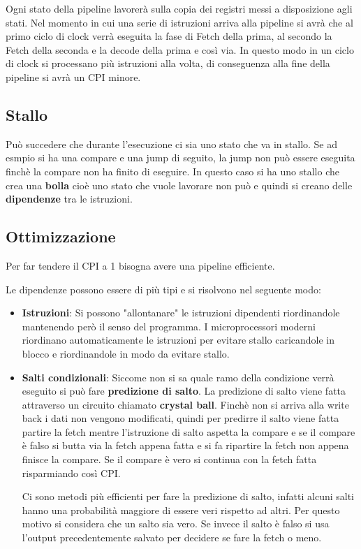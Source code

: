 \documentclass[a4paper]{article}
\theoremstyle{break}
\theoremstyle{break}
\theoremstyle{break}
\theoremstyle{break}
\begin{document}
\noindent Ogni stato della pipeline lavorerà sulla copia dei registri messi a disposizione
agli stati. Nel momento in cui una serie di istruzioni arriva alla pipeline si avrà che
al primo ciclo di clock verrà eseguita la fase di Fetch della prima, al secondo la Fetch
della seconda e la decode della prima e così via. In questo modo in un ciclo di clock
si processano più istruzioni alla volta, di conseguenza alla fine della pipeline
si avrà un CPI minore.

\subsection{Stallo}
Può succedere che durante l'esecuzione ci sia uno stato che va in stallo. Se ad esmpio
si ha una compare e una jump di seguito, la jump non può essere eseguita finchè la
compare non ha finito di eseguire. In questo caso si ha uno stallo che crea una
\textbf{bolla} cioè uno stato che vuole lavorare non può e quindi si creano delle
\textbf{dipendenze} tra le istruzioni.

\subsection{Ottimizzazione}
Per far tendere il CPI a 1 bisogna avere una pipeline efficiente.

\vspace{1em}
\noindent Le dipendenze possono essere di più tipi e si risolvono nel seguente modo:
\begin{itemize}
  \item \textbf{Istruzioni}:
    Si possono "allontanare" le istruzioni dipendenti riordinandole
    mantenendo però il senso del programma. I microprocessori moderni riordinano
    automaticamente le istruzioni per evitare stallo caricandole in blocco e
    riordinandole in modo da evitare stallo.
  \item \textbf{Salti condizionali}: Siccome non si sa quale ramo della condizione
    verrà eseguito si può fare \textbf{predizione di salto}. La predizione di salto
    viene fatta attraverso un circuito chiamato \textbf{crystal ball}. Finchè non si
    arriva alla write back i dati non vengono modificati, quindi per predirre il salto
    viene fatta partire la fetch mentre l'istruzione di salto aspetta la compare e
    se il compare è falso si butta via la fetch appena fatta e si fa ripartire la
    fetch non appena finisce la compare. Se il compare è vero si continua con la fetch
    fatta risparmiando così CPI.

    \vspace{1em}
    \noindent Ci sono metodi più efficienti per fare la predizione di salto, infatti alcuni
    salti hanno una probabilità maggiore di essere veri rispetto ad altri. Per questo
    motivo si considera che un salto sia vero. Se invece il salto è falso si usa
    l'output precedentemente salvato per decidere se fare la fetch o meno.
\end{itemize}
\end{document}
